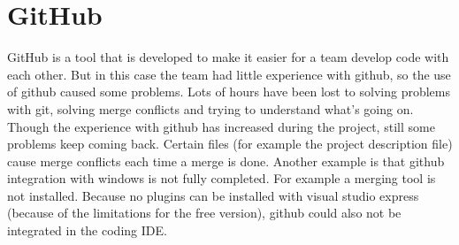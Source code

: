 \section{GitHub}
GitHub is a tool that is developed to make it easier for a team develop code with each other. But in this case the team had little experience with github, so the use of github caused some problems. Lots of hours have been lost to solving problems with git, solving merge conflicts and trying to understand what's going on. Though the experience with github has increased during the project, still some problems keep coming back. Certain files (for example the project description file) cause merge conflicts each time a merge is done. 
Another example is that github integration with windows is not fully completed. For example a merging tool is not installed. Because no plugins can be installed with visual studio express (because of the limitations for the free version), github could also not be integrated in the coding IDE.
